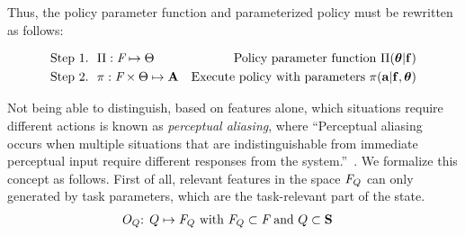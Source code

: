 \documentclass[12pt]{article}
\newcommand{\mymath}[1]{\ensuremath{#1}\xspace}
\newcommand{\pol}    {\mymath{\pi}}
\newcommand{\act}    {\mymath{\mathbf{a}}}
\newcommand{\actsp}  {\mymath{\mathbf{A}}}
\newcommand{\stasp}  {\mymath{\mathbf{S}}}
\newcommand{\app}    {\mymath{\bm{\theta}}}
\newcommand{\appsp}  {\mymath{\Theta}}
\newcommand{\polg}   {\mymath{\Pi}}
\newcommand{\taskpsp}{\mymath{Q}}
\newcommand{\featv}  {\mymath{\mathbf{f}}}
\newcommand{\featsp} {\mymath{\emph{F}}}
\newcommand{\obsm}   {\mymath{O}}
\begin{document}
Thus, the policy parameter function and parameterized policy must be rewritten as follows: 

\begin{align}
\mbox{Step 1.~~}&\polg:\featsp\mapsto\appsp & \mbox{Policy parameter function~} \polg(\app|\featv)\label{eq:pol_par_fun}\\
\mbox{Step 2.~~}&\pol:\featsp\times\appsp\mapsto\actsp & \mbox{Execute policy with parameters~}  \pol(\act|\featv,\app)
\end{align}

Not being able to distinguish, based on features alone, which situations require different actions is known as \emph{perceptual aliasing}, where ``Perceptual aliasing occurs when multiple situations that are indistinguishable from immediate perceptual input require different responses from the system.''~\cite{chrisman92reinforcement}.
We formalize this concept as follows.
First of all, relevant features in the space $\featsp_Q$ can only generated by task parameters, which are the task-relevant part of the state.
\begin{align}
\obsm_Q\mbox{: } &\label{eq:obs_task}\taskpsp \mapsto \featsp_Q \mbox{~with~} \featsp_Q \subset \featsp \mbox{~and~}  \taskpsp \subset \stasp
\end{align}


\end{document}
